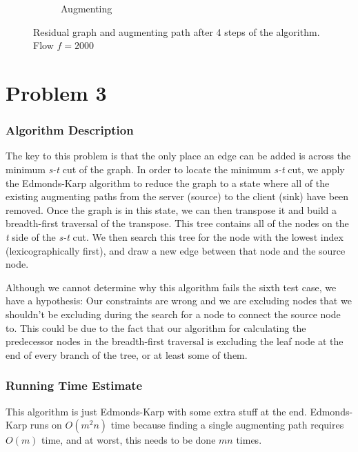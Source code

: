 \documentclass{math}
\begin{document}
\begin{figure}[p]
\begin{subfigure}[h]{0.49\textwidth}
        \caption{Augmenting}
    \end{subfigure}
    \caption{Residual graph and augmenting path after 4 steps of the algorithm.
    Flow $f = 2000$}
    \label{fig:step4}
\end{figure}


\section*{Problem 3}

\subsubsection*{Algorithm Description}

The key to this problem is that the only place an edge can be added is across
the minimum \emph{s-t} cut of the graph.  In order to locate the minimum
\emph{s-t} cut, we apply the Edmonds-Karp algorithm to reduce the graph to a
state where all of the existing augmenting paths from the server (source) to the
client (sink) have been removed.  Once the graph is in this state, we can then
transpose it and build a breadth-first traversal of the transpose.  This tree
contains all of the nodes on the \emph{t} side of the \emph{s-t} cut.  We then
search this tree for the node with the lowest index (lexicographically first),
and draw a new edge between that node and the source node.

Although we cannot determine why this algorithm fails the sixth test case, we
have a hypothesis: Our constraints are wrong and we are excluding nodes that
we shouldn't be excluding during the search for a node to connect the source
node to. This could be due to the fact that our algorithm for calculating the
predecessor nodes in the breadth-first traversal is excluding the leaf node at
the end of every branch of the tree, or at least some of them.


\subsubsection*{Running Time Estimate}
This algorithm is just Edmonds-Karp with some extra stuff at the end.
Edmonds-Karp runs on \( O(m^2n) \) time because finding a single augmenting path
requires \( O(m) \) time, and at worst, this needs to be done \( mn \) times.
\end{document}
